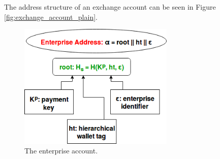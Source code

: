 The address structure of an exchange account can be seen in Figure \ref{fig:exchange_account_plain}.

\begin{figure}
  \begin{center}
    \includegraphics[width=210pt]{figures/enterprise_account_plain.png}
  \end{center}
  \caption{The enterprise account.}
  \label{fig:enterprise_account_plain}
\end{figure}
